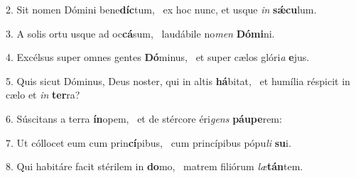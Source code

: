 2. Sit nomen Dómini bene\textbf{díc}tum, \ast\  ex hoc nunc, et usque \textit{in} \textbf{sǽ}\textbf{cu}lum.\

3. A solis ortu usque ad oc\textbf{cá}sum, \ast\  laudábile no\textit{men} \textbf{Dó}\textbf{mi}ni.\

4. Excélsus super omnes gentes \textbf{Dó}minus, \ast\  et super cælos glóri\textit{a} \textbf{e}jus.\

5. Quis sicut Dóminus, Deus noster, qui in altis \textbf{há}bitat, \ast\  et humília réspicit in cælo et \textit{in} \textbf{ter}ra?\

6. Súscitans a terra \textbf{ín}opem, \ast\  et de stércore éri\textit{gens} \textbf{páu}\textbf{pe}rem:\

7. Ut cóllocet eum cum prin\textbf{cí}pibus, \ast\  cum princípibus pópu\textit{li} \textbf{su}i.\

8. Qui habitáre facit stérilem in \textbf{do}mo, \ast\  matrem filiórum \textit{læ}\textbf{tán}tem.\

